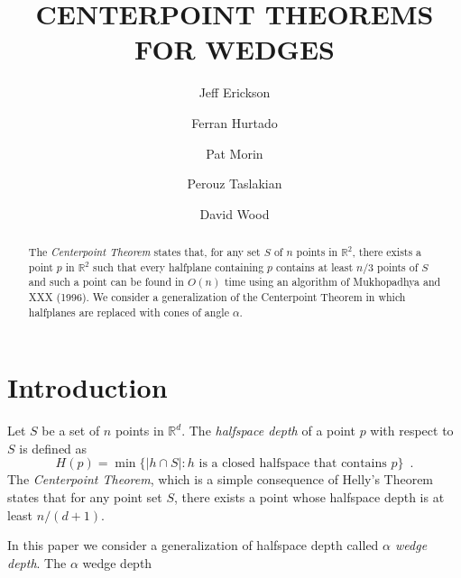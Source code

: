\documentclass[lotsofwhite]{patmorin}
\title{\MakeUppercase{Centerpoint Theorems for Wedges}}
\author{Jeff Erickson \and
	Ferran Hurtado \and
	Pat Morin \and
	Perouz Taslakian \and
	David Wood}
\date{}
\begin{document}
\maketitle

\begin{abstract}
The \emph{Centerpoint Theorem} states that, for any set $S$ of $n$ points
in $\mathbb{R}^2$, there exists a point $p$ in $\mathbb{R}^2$ such
that every halfplane containing $p$ contains at least $n/3$ points of
$S$ and such a point can be found in $O(n)$ time using an algorithm of
Mukhopadhya and XXX (1996).  We consider a generalization of the
Centerpoint Theorem in which halfplanes are replaced with cones of
angle $\alpha$.
\end{abstract}

\section{Introduction}

Let $S$ be a set of $n$ points in $\mathbb{R}^d$.  The \emph{halfspace
depth} \cite{t73} of a point $p$ with respect to $S$ is defined as
\begin{equation}
H(p) = \min\{|h\cap S| : \mbox{$h$ is a closed halfspace that contains $p$} \}
\enspace .
\end{equation}
The \emph{Centerpoint Theorem}, which is a simple consequence of
Helly's Theorem \cite{X} states that for any point set $S$, there
exists a point whose halfspace depth is at least $n/(d+1)$.  

In this paper we consider a generalization of halfspace depth called
\emph{$\alpha$ wedge depth}.  The $\alpha$ wedge depth
\end{document}

